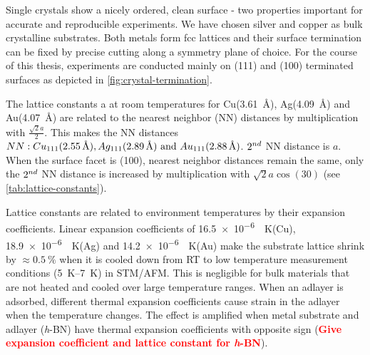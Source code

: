 Single crystals show a nicely ordered, clean surface - two properties important for accurate and reproducible experiments. We have chosen silver and copper as bulk crystalline substrates. Both metals form fcc lattices and their surface termination can be fixed by precise cutting along a symmetry plane of choice. For the course of this thesis, experiments are conducted mainly on (111) and (100) terminated surfaces as depicted in \autoref{fig:crystal-termination}.

The lattice constants a at room temperatures for  Cu(\SI{3,61}{\angstrom}), Ag(\SI{4,09}{\angstrom}) and Au(\SI{4,07}{\angstrom})\cite{_ptable} are related to the nearest neighbor (NN) distances by multiplication with $\frac{\sqrt{2}a}{2}$. This makes the NN distances $NN: Cu_{111}(\SI{2,55}{\angstrom}), Ag_{111}(\SI{2,89}{\angstrom})\textnormal{ and } Au_{111}(\SI{2,88}{\angstrom})$. $\textnormal{2}^{nd}$ NN distance is $a$. When the surface facet is (100), nearest neighbor distances remain the same, only the $\textnormal{2}^{nd}$ NN distance is increased by multiplication with $\sqrt{2}a\cos(30)$ (see \autoref{tab:lattice-constants}).

Lattice constants are related to environment temperatures by their expansion coefficients.
Linear expansion coefficients of \SI{16,5e-6}{\per \kelvin}(Cu), \SI{18,9e-6}{\per \kelvin}(Ag) and \SI{14,2e-6}{\per \kelvin}(Au) make the substrate lattice shrink by $\approx \SI{0,5}{\percent}$ when it is cooled down from RT to low temperature measurement conditions (\SIrange{5}{7}{\kelvin}) in STM/AFM. This is negligible for bulk materials that are not heated and cooled over large temperature ranges. When an adlayer is adsorbed, different thermal expansion coefficients cause strain in the adlayer when the temperature changes. The effect is amplified when metal substrate and adlayer (\textit{h}-BN)
have thermal expansion coefficients with opposite sign (\textcolor{red}{\textbf{Give expansion coefficient and lattice constant for \textit{h}-BN}}).\cite{farwick_zum_hagen_structure_2016}

